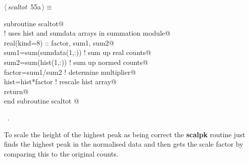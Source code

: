 \documentclass[10pt,a4paper,notitlepage]{article}
\newcommand{\code}[1]{\textbf{\textsf{#1}}} %
\begin{document}
\begin{flushleft} \small
\begin{minipage}{\linewidth}\label{scrap58}\raggedright\small
{} $\langle\,${\it scaltot}\nobreak\ {\footnotesize {55a}}$\,\rangle\equiv$
\vspace{-1ex}
\begin{list}{}{} \item
\mbox{}\verb@      subroutine scaltot@\\
\mbox{}\verb@! uses hist and sumdata arrays in summation module@\\
\mbox{}\verb@      real(kind=8) :: factor, sum1, sum2@\\
\mbox{}\verb@      sum1=sum(sumdata(1,:)) ! sum up real counts@\\
\mbox{}\verb@      sum2=sum(hist(1,:))    ! sum up normed counts@\\
\mbox{}\verb@      factor=sum1/sum2       ! determine multiplier@\\
\mbox{}\verb@      hist=hist*factor       ! rescale hist array@\\
\mbox{}\verb@      return@\\
\mbox{}\verb@      end subroutine scaltot                                               @{\NWsep}
\end{list}
\vspace{-1.5ex}
\footnotesize
\begin{list}{}{\setlength{\itemsep}{-\parsep}\setlength{\itemindent}{-\leftmargin}}
\item \NWtxtMacroRefIn\ .

\item{}
\end{list}
\end{minipage}\vspace{4ex}
\end{flushleft}
To scale the height of the highest peak as being correct the \code{scalpk}
routine just finds the highest peak in the normalised data and then
gets the scale factor by comparing this to the original counts.
\end{document}
